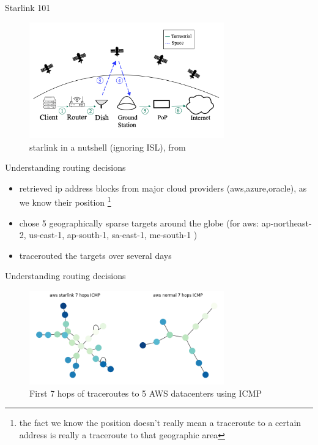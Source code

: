 \documentclass[NET,english,beameralt]{tumbeamer}
\begin{document}
\begin{frame}{Starlink 101}
\begin{figure}
    \includegraphics[width=0.75\textwidth]{pics/starlink-101.png}
    \caption[short]{starlink in a nutshell (ignoring ISL), from \cite{izhikevich2023democratizing}}
\end{figure}
\end{frame}

\begin{frame}{Understanding routing decisions}
\begin{itemize}
    \item retrieved ip address blocks from major cloud providers (aws,azure,oracle), as we know their position
    \footnote[]{the fact we know the position doesn't really mean a traceroute to a certain address is really a
    traceroute to that geographic area}
    \item chose 5 geographically sparse targets around the globe (for aws: ap-northeast-2, us-east-1, ap-south-1,
    sa-east-1, me-south-1 )
    \item tracerouted the targets over several days 
\end{itemize}
\end{frame}

\begin{frame}{Understanding routing decisions}
\begin{figure}
    \includegraphics[width=0.75\textwidth]{pics/aws_7_icmp.png}
    \caption[short]{First 7 hops of traceroutes to 5 AWS datacenters using ICMP}
\end{figure}
\end{frame}
\end{document}
